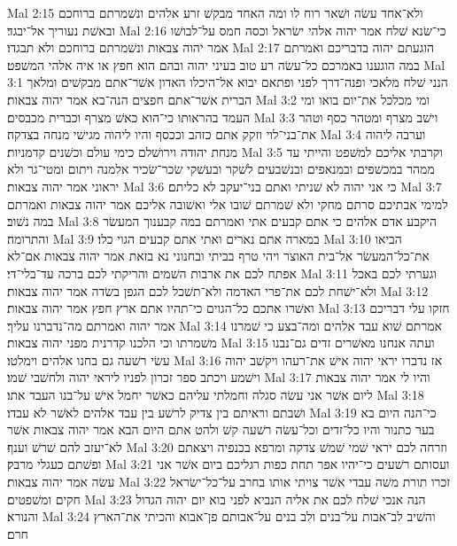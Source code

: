Mal 2:15  ולא־אחד עשׂה ושׁאר רוח לו ומה האחד מבקשׁ זרע אלהים ונשׁמרתם ברוחכם ובאשׁת נעוריך אל־יבגד׃
Mal 2:16  כי־שׂנא שׁלח אמר יהוה אלהי ישׂראל וכסה חמס על־לבושׁו אמר יהוה צבאות ונשׁמרתם ברוחכם ולא תבגדו׃
Mal 2:17  הוגעתם יהוה בדבריכם ואמרתם במה הוגענו באמרכם כל־עשׂה רע טוב בעיני יהוה ובהם הוא חפץ או איה אלהי המשׁפט׃
Mal 3:1  הנני שׁלח מלאכי ופנה־דרך לפני ופתאם יבוא אל־היכלו האדון אשׁר־אתם מבקשׁים ומלאך הברית אשׁר־אתם חפצים הנה־בא אמר יהוה צבאות׃
Mal 3:2  ומי מכלכל את־יום בואו ומי העמד בהראותו כי־הוא כאשׁ מצרף וכברית מכבסים׃
Mal 3:3  וישׁב מצרף ומטהר כסף וטהר את־בני־לוי וזקק אתם כזהב וככסף והיו ליהוה מגישׁי מנחה בצדקה׃
Mal 3:4  וערבה ליהוה מנחת יהודה וירושׁלם כימי עולם וכשׁנים קדמניות׃
Mal 3:5  וקרבתי אליכם למשׁפט והייתי עד ממהר במכשׁפים ובמנאפים ובנשׁבעים לשׁקר ובעשׁקי שׂכר־שׂכיר אלמנה ויתום ומטי־גר ולא יראוני אמר יהוה צבאות׃
Mal 3:6  כי אני יהוה לא שׁניתי ואתם בני־יעקב לא כליתם׃
Mal 3:7  למימי אבתיכם סרתם מחקי ולא שׁמרתם שׁובו אלי ואשׁובה אליכם אמר יהוה צבאות ואמרתם במה נשׁוב׃
Mal 3:8  היקבע אדם אלהים כי אתם קבעים אתי ואמרתם במה קבענוך המעשׂר והתרומה׃
Mal 3:9  במארה אתם נארים ואתי אתם קבעים הגוי כלו׃
Mal 3:10  הביאו את־כל־המעשׂר אל־בית האוצר ויהי טרף בביתי ובחנוני נא בזאת אמר יהוה צבאות אם־לא אפתח לכם את ארבות השׁמים והריקתי לכם ברכה עד־בלי־די׃
Mal 3:11  וגערתי לכם באכל ולא־ישׁחת לכם את־פרי האדמה ולא־תשׁכל לכם הגפן בשׂדה אמר יהוה צבאות׃
Mal 3:12  ואשׁרו אתכם כל־הגוים כי־תהיו אתם ארץ חפץ אמר יהוה צבאות׃
Mal 3:13  חזקו עלי דבריכם אמר יהוה ואמרתם מה־נדברנו עליך׃
Mal 3:14  אמרתם שׁוא עבד אלהים ומה־בצע כי שׁמרנו משׁמרתו וכי הלכנו קדרנית מפני יהוה צבאות׃
Mal 3:15  ועתה אנחנו מאשׁרים זדים גם־נבנו עשׂי רשׁעה גם בחנו אלהים וימלטו׃
Mal 3:16  אז נדברו יראי יהוה אישׁ את־רעהו ויקשׁב יהוה וישׁמע ויכתב ספר זכרון לפניו ליראי יהוה ולחשׁבי שׁמו׃
Mal 3:17  והיו לי אמר יהוה צבאות ליום אשׁר אני עשׂה סגלה וחמלתי עליהם כאשׁר יחמל אישׁ על־בנו העבד אתו׃
Mal 3:18  ושׁבתם וראיתם בין צדיק לרשׁע בין עבד אלהים לאשׁר לא עבדו׃
Mal 3:19  כי־הנה היום בא בער כתנור והיו כל־זדים וכל־עשׂה רשׁעה קשׁ ולהט אתם היום הבא אמר יהוה צבאות אשׁר לא־יעזב להם שׁרשׁ וענף׃
Mal 3:20  וזרחה לכם יראי שׁמי שׁמשׁ צדקה ומרפא בכנפיה ויצאתם ופשׁתם כעגלי מרבק׃
Mal 3:21  ועסותם רשׁעים כי־יהיו אפר תחת כפות רגליכם ביום אשׁר אני עשׂה אמר יהוה צבאות׃
Mal 3:22  זכרו תורת משׁה עבדי אשׁר צויתי אותו בחרב על־כל־ישׂראל חקים ומשׁפטים׃
Mal 3:23  הנה אנכי שׁלח לכם את אליה הנביא לפני בוא יום יהוה הגדול והנורא׃
Mal 3:24  והשׁיב לב־אבות על־בנים ולב בנים על־אבותם פן־אבוא והכיתי את־הארץ חרם׃


